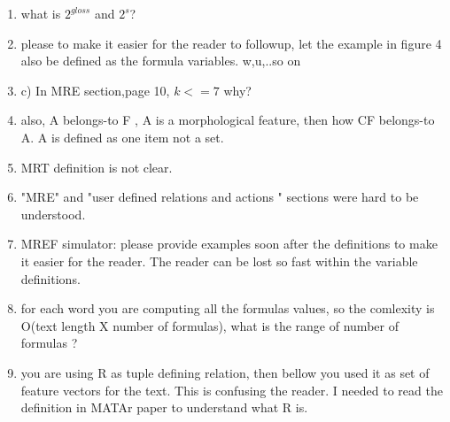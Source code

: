 \begin{enumerate}[leftmargin=0mm,label=\bfseries CommentR3.\arabic*]
\item \label{Review.3.14}
what is $2^{gloss}$ and $2^{s}$?


\item \label{Review.3.15}
please to make it easier for the reader to followup, 
let the example in figure 4 also be defined as the formula 
variables. w,{u},..so on


\item \label{Review.3.16}
c) In MRE section,page 10, $k <=7$ why? 

\item \label{Review.3.17}
also, A belongs-to F , A is a morphological feature, 
then how CF belongs-to A. A is defined as one item not a set.


\item \label{Review.3.18}
MRT definition is not clear.


\item \label{Review.3.19}
"MRE" and "user defined relations and actions " sections 
were hard to be understood.

\item \label{Review.3.20}
MREF simulator: please provide examples soon after the 
definitions to make it easier for the reader. 
The reader can be lost so fast within the variable definitions. 


\item \label{Review.3.21}
for each word you are computing all the formulas values, 
so the comlexity is O(text length X number of formulas), 
what is the range of number of formulas ?


\item \label{Review.3.22}
you are using R as tuple defining relation, 
then bellow you used it as set of feature vectors for the text. 
This is confusing the reader. 
I needed to read the definition in MATAr paper to understand 
what R is.



\end{enumerate}
